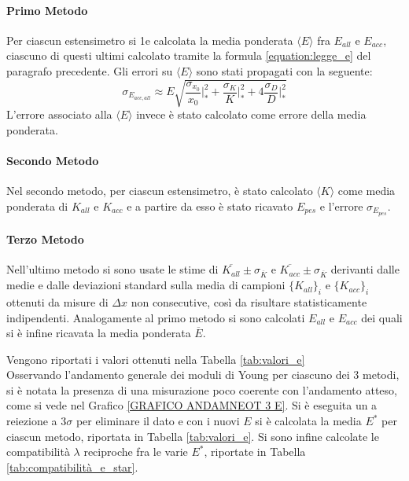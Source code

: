 \documentclass[a4paper,11pt,oneside]{article}
\begin{document}
\paragraph{Primo Metodo}
Per ciascun estensimetro si 1e calcolata la media ponderata $\langle E \rangle $ fra $E_{all}$ e $E_{acc}$, ciascuno di questi ultimi calcolato tramite la formula \ref{equation:legge_e} del paragrafo precedente. Gli errori su $\langle E \rangle$ sono stati propagati con la seguente:
\begin{equation}
    \label{eq:propagazione_particolare}
    \sigma_{E_{acc, all}} \approx E\sqrt{\frac{\sigma_{x_{0}}}{x_{0}}\Big|_{\ast}^2+\frac{\sigma_{K}}{K}\Big|_{\ast}^2+4\frac{\sigma_{D}}{D}\Big|_{\ast}^2}
\end{equation}
L'errore associato alla $\langle E \rangle $ invece è stato calcolato come errore della media ponderata.

\paragraph{Secondo Metodo}
Nel secondo metodo, per ciascun estensimetro, è stato calcolato $\langle K \rangle $ come media ponderata di $K_{all}$ e $K_{acc}$ e a partire da esso è stato ricavato $E_{pes}$ e l'errore $\sigma_{E_{pes}}$.

\paragraph{Terzo Metodo}
Nell'ultimo metodo si sono usate le stime di $\overline{K_{all}} \pm \sigma_{\overline{K}}$ e $\overline{K_{acc}} \pm \sigma_{\overline{K}}$ derivanti dalle medie e dalle deviazioni standard sulla media di campioni $\{ K_{all} \}_i$ e $\{ K_{acc}\}_i $ ottenuti da misure di $\Delta x$ non consecutive, così da risultare statisticamente indipendenti. Analogamente al primo metodo si sono calcolati $E_{all}$ e $E_{acc}$ dei quali si è infine ricavata la media ponderata $\overline{E}$.

Vengono riportati i valori ottenuti nella Tabella \ref{tab:valori_e}\\


Osservando l'andamento generale dei moduli di Young per ciascuno dei 3 metodi, si è notata la presenza di una misurazione poco coerente con l'andamento atteso, come si vede nel Grafico \ref{GRAFICO ANDAMNEOT 3 E}.
Si è eseguita un a reiezione a $3\sigma$ per eliminare il dato e con i nuovi $E$ si è calcolata la media $E^{\ast}$ per ciascun metodo, riportata in Tabella \ref{tab:valori_e}. Si sono infine calcolate le compatibilità $\lambda$ reciproche fra le varie $E^{\ast}$, riportate in Tabella \ref{tab:compatibilità_e_star}.
\end{document}
